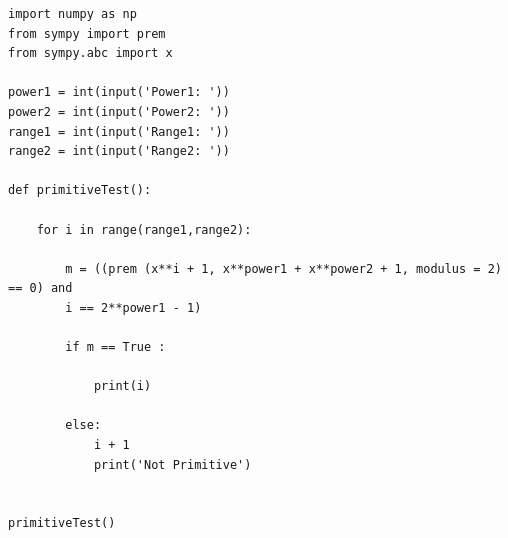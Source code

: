 \documentclass[a4paper, 11pt]{article}
\begin{document}

\lstset{language=Python}
\lstset{frame=lines}
\lstset{basicstyle=\footnotesize}
\begin{lstlisting}
import numpy as np
from sympy import prem
from sympy.abc import x
    
power1 = int(input('Power1: '))
power2 = int(input('Power2: '))
range1 = int(input('Range1: '))
range2 = int(input('Range2: '))
    
def primitiveTest():
       
    for i in range(range1,range2):
            
        m = ((prem (x**i + 1, x**power1 + x**power2 + 1, modulus = 2) == 0) and 
        i == 2**power1 - 1)
    
        if m == True :
     
            print(i)
    
        else:
            i + 1
            print('Not Primitive')
           
    
primitiveTest()
\end{lstlisting}
\end{document}
